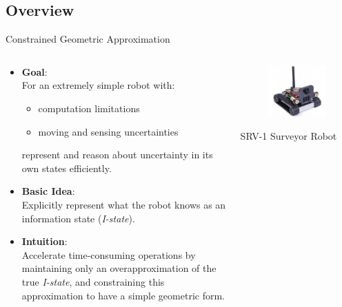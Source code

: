 \subsection[Problem]{Overview}
\begin{frame}{Constrained Geometric Approximation}
\begin{columns}
  \begin{column}{.65\textwidth}
    \begin{itemize}
    \item \textbf{Goal}:\\
    For an extremely simple robot with:
    \begin{itemize}
    \item computation limitations
    \item moving and sensing uncertainties
    \end{itemize}
    represent and reason about uncertainty in its own states efficiently.\\
    \item \textbf{Basic Idea}:\\
    Explicitly represent what the robot knows as an information state (\textit{I-state}).
    \item \textbf{Intuition}:\\
    Accelerate time-consuming operations by maintaining only an \textcolor[rgb]{1.00,0.00,0.00}{overapproximation} of the true
    \emph{I-state}, and constraining this approximation
    to have a simple geometric form.\\
    \end{itemize}
  \end{column}
  \begin{column}{.35\textwidth}
    \begin{figure}
    \includegraphics[scale=0.2]{figs/srvq.jpg}
    \end{figure}
    SRV-1 Surveyor Robot
  \end{column}
\end{columns}
\end{frame}

